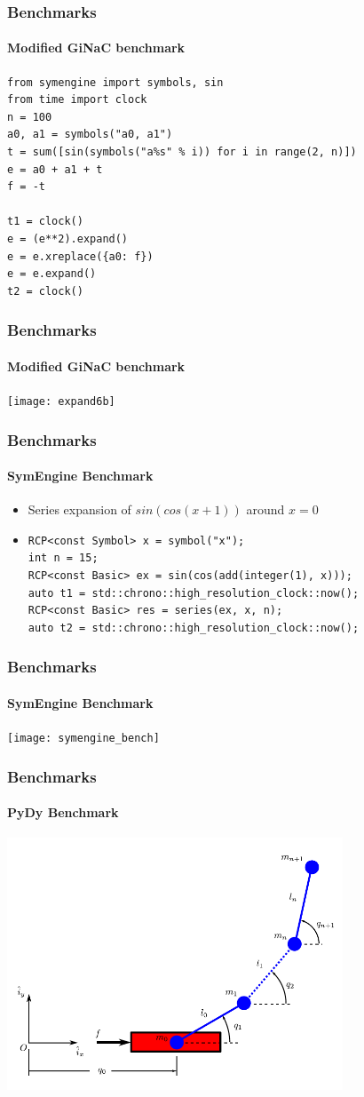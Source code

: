 \documentclass{beamer}
\begin{document}
\begin{frame}[fragile]
\frametitle{Benchmarks}
\framesubtitle{Modified GiNaC benchmark}
\begin{verbatim}
from symengine import symbols, sin
from time import clock
n = 100
a0, a1 = symbols("a0, a1")
t = sum([sin(symbols("a%s" % i)) for i in range(2, n)])
e = a0 + a1 + t
f = -t

t1 = clock()
e = (e**2).expand()
e = e.xreplace({a0: f})
e = e.expand()
t2 = clock()
\end{verbatim}
\end{frame}

\begin{frame}
\frametitle{Benchmarks}
\framesubtitle{Modified GiNaC benchmark}
\texttt{[image: expand6b]}
\end{frame}

\begin{frame}[fragile]
\frametitle{Benchmarks}
\framesubtitle{SymEngine Benchmark}
\begin{itemize}
\item Series expansion of $sin(cos(x+1))$ around $x=0$
\linebreak
\item
\begin{verbatim}
RCP<const Symbol> x = symbol("x");
int n = 15;
RCP<const Basic> ex = sin(cos(add(integer(1), x)));
auto t1 = std::chrono::high_resolution_clock::now();
RCP<const Basic> res = series(ex, x, n);
auto t2 = std::chrono::high_resolution_clock::now();
\end{verbatim}

\end{itemize}
\end{frame}

\begin{frame}
\frametitle{Benchmarks}
\framesubtitle{SymEngine Benchmark}
\texttt{[image: symengine\_bench]}
\end{frame}


\begin{frame}
\frametitle{Benchmarks}
\framesubtitle{PyDy Benchmark}
\includegraphics[width=10cm]{n-pendulum-with-cart}
\end{frame}
\end{document}
